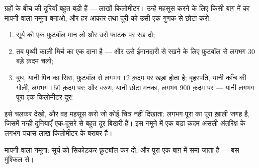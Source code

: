 \begin{method}[सौर मंडल का मापनी वाला नमूना]\label{met:g4:solar-system:model}
ग्रहों के बीच की दूरियाँ बहुत बड़ी हैं --- लाखों किलोमीटर। उन्हें
महसूस करने के लिए किसी बाग़ में  का मापनी वाला नमूना बनाओ, और
हर आकार तथा दूरी को उसी एक गुणक से छोटा करो:
\begin{enumerate}
  \item सूर्य को एक फ़ुटबॉल मान लो और उसे फाटक पर रख दो;
  \item तब पृथ्वी काली मिर्च का एक दाना है --- और उसे ईमानदारी से
        रखने के लिए फ़ुटबॉल से लगभग $30$ बड़े क़दम चलो;
  \item बुध, यानी पिन का सिरा, फ़ुटबॉल से लगभग $12$ क़दम पर खड़ा
        होता है; बृहस्पति, यानी काँच की गोली, लगभग $150$ क़दम पर; और
        वरुण, यानी छोटा मनका, लगभग $900$ क़दम पर --- यानी लगभग पूरा
        एक किलोमीटर दूर!
\end{enumerate}
इसे चलकर देखो, और वह महसूस करो जो कोई चित्र नहीं दिखाता: 
लगभग पूरा का पूरा ख़ाली जगह है, जिसमें नन्ही दुनियाएँ एक-दूसरे से
बहुत दूर बिखरी हैं। इस नमूने में एक बड़ा क़दम असली अंतरिक्ष के लगभग
पचास लाख किलोमीटर के बराबर है।
\end{method}

\begin{omfigure}

{\small मापनी वाला नमूना: सूर्य को सिकोड़कर फ़ुटबॉल कर दो, और पूरा
 एक बाग़ में समा जाता है --- बस मुश्किल से।}
\end{omfigure}

